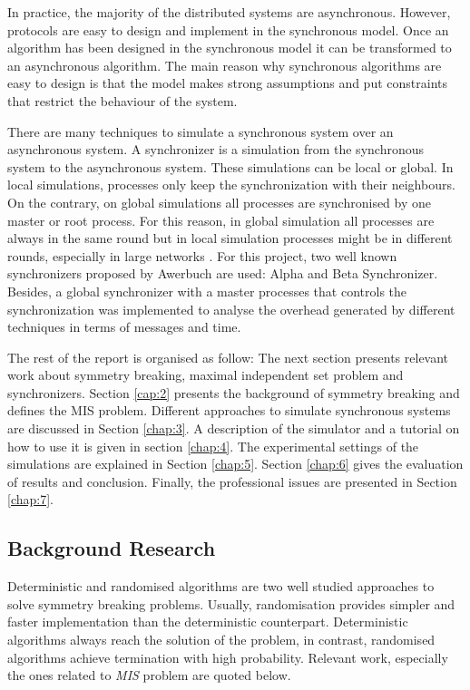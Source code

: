 In practice, the majority of the distributed systems are asynchronous. However, protocols are easy to design and implement in the synchronous model. Once an algorithm has been designed in the synchronous model it can be transformed to an asynchronous algorithm. The main reason why synchronous algorithms are easy to design is that the model makes strong assumptions and put constraints that restrict the behaviour of the system.


There are many techniques to simulate a synchronous system over an asynchronous system. A synchronizer is a simulation from the synchronous system to the asynchronous system. These simulations can be local or global. In local simulations, processes only keep the synchronization with their neighbours. On the contrary, on global simulations all processes are synchronised by one master or root process.  For this reason, in global simulation all processes are always in the same round but in local simulation processes might be in different rounds, especially in large networks \cite{attiya2004distributed}. For this project, two well known synchronizers proposed by Awerbuch \cite{awerbuch1985complexity} are used: Alpha and Beta Synchronizer. Besides, a global synchronizer with a master processes that controls the synchronization was implemented to analyse the overhead generated by different techniques in terms of messages and time.




The rest of the report is organised as follow: The next section presents relevant work about symmetry breaking, maximal independent set problem and synchronizers. Section \ref{cap:2} presents the background of symmetry breaking and defines the MIS problem. Different approaches to simulate synchronous systems are discussed in Section \ref{chap:3}. A description of the simulator and a tutorial on how to use it is given in section \ref{chap:4}. The experimental settings of the simulations are explained in Section \ref{chap:5}. Section \ref{chap:6} gives the evaluation of results and conclusion. Finally, the professional issues are presented in Section \ref{chap:7}. 

\subsection{Background Research}
 
Deterministic and randomised algorithms are two well studied approaches to solve symmetry breaking problems. Usually, randomisation provides simpler and faster implementation than the deterministic counterpart. Deterministic algorithms always reach the solution of the problem, in contrast, randomised algorithms achieve termination with high probability. Relevant work, especially the ones related to \textit{MIS} problem are quoted below.

